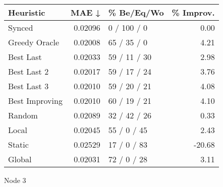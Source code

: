 \begin{tabular}{lrlr}
\toprule
\textbf{Heuristic} & \textbf{MAE ↓} & \textbf{\% Be/Eq/Wo} & \textbf{\% Improv.} \\
\midrule
            Synced &        0.02096 &          0 / 100 / 0 &                0.00 \\
     Greedy Oracle &        0.02008 &          65 / 35 / 0 &                4.21 \\
         Best Last &        0.02033 &         59 / 11 / 30 &                2.98 \\
       Best Last 2 &        0.02017 &         59 / 17 / 24 &                3.76 \\
       Best Last 3 &        0.02010 &         59 / 20 / 21 &                4.08 \\
    Best Improving &        0.02010 &         60 / 19 / 21 &                4.10 \\
            Random &        0.02089 &         32 / 42 / 26 &                0.33 \\
             Local &        0.02045 &          55 / 0 / 45 &                2.43 \\
            Static &        0.02529 &          17 / 0 / 83 &              -20.68 \\
            Global &        0.02031 &          72 / 0 / 28 &                3.11 \\
\bottomrule
\end{tabular}
\caption{Node 3}
\label{tab:iid_lr01_le2_bs4_3}
